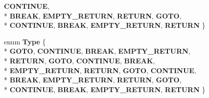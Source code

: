 \begin{DoxyCompactItemize}
{\bfseries C\-O\-N\-T\-I\-N\-U\-E}, 
\\*
{\bfseries B\-R\-E\-A\-K}, 
{\bfseries E\-M\-P\-T\-Y\-\_\-\-R\-E\-T\-U\-R\-N}, 
{\bfseries R\-E\-T\-U\-R\-N}, 
{\bfseries G\-O\-T\-O}, 
\\*
{\bfseries C\-O\-N\-T\-I\-N\-U\-E}, 
{\bfseries B\-R\-E\-A\-K}, 
{\bfseries E\-M\-P\-T\-Y\-\_\-\-R\-E\-T\-U\-R\-N}, 
{\bfseries R\-E\-T\-U\-R\-N}
 \}
\item 
enum {\bfseries Type} \{ \\*
{\bfseries G\-O\-T\-O}, 
{\bfseries C\-O\-N\-T\-I\-N\-U\-E}, 
{\bfseries B\-R\-E\-A\-K}, 
{\bfseries E\-M\-P\-T\-Y\-\_\-\-R\-E\-T\-U\-R\-N}, 
\\*
{\bfseries R\-E\-T\-U\-R\-N}, 
{\bfseries G\-O\-T\-O}, 
{\bfseries C\-O\-N\-T\-I\-N\-U\-E}, 
{\bfseries B\-R\-E\-A\-K}, 
\\*
{\bfseries E\-M\-P\-T\-Y\-\_\-\-R\-E\-T\-U\-R\-N}, 
{\bfseries R\-E\-T\-U\-R\-N}, 
{\bfseries G\-O\-T\-O}, 
{\bfseries C\-O\-N\-T\-I\-N\-U\-E}, 
\\*
{\bfseries B\-R\-E\-A\-K}, 
{\bfseries E\-M\-P\-T\-Y\-\_\-\-R\-E\-T\-U\-R\-N}, 
{\bfseries R\-E\-T\-U\-R\-N}, 
{\bfseries G\-O\-T\-O}, 
\\*
{\bfseries C\-O\-N\-T\-I\-N\-U\-E}, 
{\bfseries B\-R\-E\-A\-K}, 
{\bfseries E\-M\-P\-T\-Y\-\_\-\-R\-E\-T\-U\-R\-N}, 
{\bfseries R\-E\-T\-U\-R\-N}
 \}
\end{DoxyCompactItemize}
